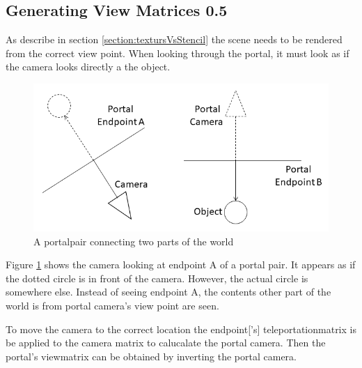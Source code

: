 \subsection{Generating View Matrices 0.5}
\label{section:generatingviewmatrices}


As describe in section \ref{section:textursVsStencil} the scene needs to be rendered from the correct view point. When looking through the portal, it must look as if the camera looks directly a the object.

\begin{figure}[H]
	\includegraphics[width=\linewidth]{images/portal.png}
	\caption{A \gls{portalpair} connecting two parts of the world}
	\label{fig:portal}
\end{figure}

Figure \ref{fig:portal} shows the camera looking at endpoint A of a portal pair. It appears as if the dotted circle is in front of the camera. However, the actual circle is somewhere else. Instead of seeing endpoint A, the contents other part of the world is from portal camera's view point are seen.


To move the camera to the correct location the \gls{endpoint}['s] \gls{teleportationmatrix} is be applied to the camera matrix to calucalate the portal camera. Then the portal's \gls{viewmatrix} can be obtained by inverting the portal camera.






